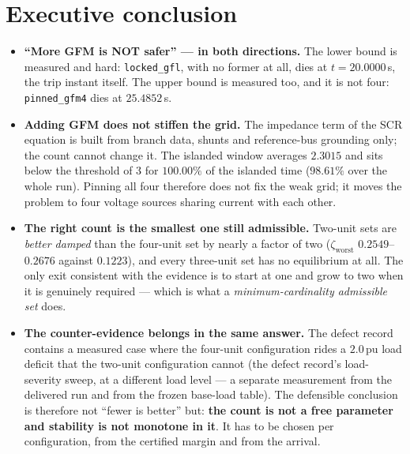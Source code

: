 \documentclass[11pt,a4paper]{article}
\newcommand{\pu}{\,\mathrm{pu}}
\newcommand{\code}[1]{\texttt{\small #1}}
\newcommand{\zworst}{\zeta_{\mathrm{worst}}}
\begin{document}
\section{Executive conclusion}

\begin{itemize}
\item \textbf{``More GFM is NOT safer'' --- in both directions.} The lower bound
      is measured and hard: \code{locked\_gfl}, with no former at all, dies at
      $t = 20.0000$\,s, the trip instant itself. The upper bound is measured too,
      and it is not four: \code{pinned\_gfm4} dies at $25.4852$\,s.
\item \textbf{Adding GFM does not stiffen the grid.} The impedance term of the
      SCR equation is built from branch data, shunts and reference-bus grounding
      only; the count cannot change it. The islanded window averages $2.3015$ and sits
      below the threshold of $3$ for $100.00\%$ of the islanded time ($98.61\%$
      over the whole run). Pinning all four therefore does not fix the weak grid;
      it moves the problem to four voltage sources sharing current with each
      other.
\item \textbf{The right count is the smallest one still admissible.} Two-unit
      sets are \emph{better damped} than the four-unit set by nearly a factor of
      two ($\zworst$ $0.2549$--$0.2676$ against $0.1223$), and every three-unit
      set has no equilibrium at all. The only exit consistent with the evidence is
      to start at one and grow to two when it is genuinely required --- which is
      what a \emph{minimum-cardinality admissible set} does.
\item \textbf{The counter-evidence belongs in the same answer.} The defect record
      contains a measured case where the four-unit configuration rides a
      $2.0\pu$ load deficit that the two-unit configuration cannot (the defect
      record's load-severity sweep, at a different load level --- a separate
      measurement from the delivered run and from the frozen base-load table).
      The defensible
      conclusion is therefore not ``fewer is better'' but: \textbf{the count is
      not a free parameter and stability is not monotone in it}. It has to be
      chosen per configuration, from the certified margin and from the arrival.
\end{itemize}
\end{document}
